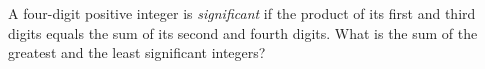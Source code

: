 A four-digit positive integer is \emph{significant} if the product of its first and third digits equals the sum of its second and fourth digits. What is the sum of the greatest and the least significant integers?
